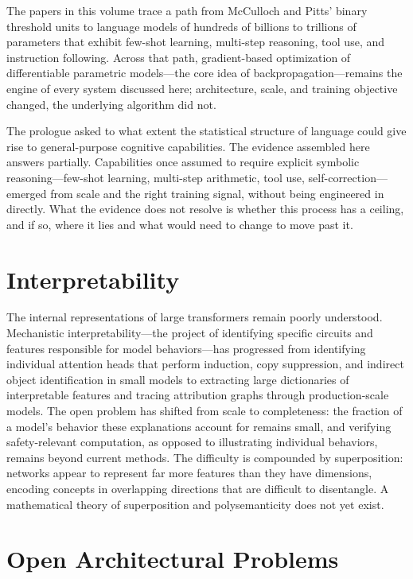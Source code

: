 
The papers in this volume trace a path from McCulloch and Pitts' binary threshold units to language models of hundreds of billions to trillions of parameters that exhibit few-shot learning, multi-step reasoning, tool use, and instruction following. Across that path, gradient-based optimization of differentiable parametric models---the core idea of backpropagation---remains the engine of every system discussed here; architecture, scale, and training objective changed, the underlying algorithm did not.

The prologue asked to what extent the statistical structure of language could give rise to general-purpose cognitive capabilities. The evidence assembled here answers partially. Capabilities once assumed to require explicit symbolic reasoning---few-shot learning, multi-step arithmetic, tool use, self-correction---emerged from scale and the right training signal, without being engineered in directly. What the evidence does not resolve is whether this process has a ceiling, and if so, where it lies and what would need to change to move past it.

\section*{Interpretability}

The internal representations of large transformers remain poorly understood. Mechanistic interpretability---the project of identifying specific circuits and features responsible for model behaviors---has progressed from identifying individual attention heads that perform induction, copy suppression, and indirect object identification in small models to extracting large dictionaries of interpretable features and tracing attribution graphs through production-scale models. The open problem has shifted from scale to completeness: the fraction of a model's behavior these explanations account for remains small, and verifying safety-relevant computation, as opposed to illustrating individual behaviors, remains beyond current methods. The difficulty is compounded by superposition: networks appear to represent far more features than they have dimensions, encoding concepts in overlapping directions that are difficult to disentangle. A mathematical theory of superposition and polysemanticity does not yet exist.

\section*{Open Architectural Problems}

